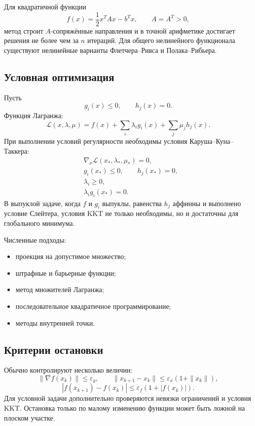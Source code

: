 Для квадратичной функции
\[
    f(x)=\frac12x^TAx-b^Tx,
    \qquad A=A^T>0,
\]
метод строит $A$-сопряжённые направления и в точной арифметике достигает решения
не более чем за $n$ итераций. Для общего нелинейного функционала существуют
нелинейные варианты Флетчера--Ривса и Полака--Рибьера.

\subsection{Условная оптимизация}

Пусть
\[
    g_i(x)\leq0,
    \qquad
    h_j(x)=0.
\]
Функция Лагранжа:
\[
    \mathcal L(x,\lambda,\mu)
    =f(x)+\sum_i\lambda_i g_i(x)+\sum_j\mu_j h_j(x).
\]
При выполнении условий регулярности необходимы условия Каруша--Куна--Таккера:
\[
\begin{aligned}
&\nabla_x\mathcal L(x_*,\lambda_*,\mu_*)=0,\\
&g_i(x_*)\leq0,\qquad h_j(x_*)=0,\\
&\lambda_i\geq0,\\
&\lambda_i g_i(x_*)=0.
\end{aligned}
\]
В выпуклой задаче, когда $f$ и $g_i$ выпуклы, равенства $h_j$ аффинны и
выполнено условие Слейтера, условия KKT не только необходимы, но и достаточны
для глобального минимума.

Численные подходы:
\begin{itemize}
    \item проекция на допустимое множество;
    \item штрафные и барьерные функции;
    \item метод множителей Лагранжа;
    \item последовательное квадратичное программирование;
    \item методы внутренней точки.
\end{itemize}

\subsection{Критерии остановки}

Обычно контролируют несколько величин:
\[
    \|\nabla f(x_k)\|\leq\varepsilon_g,
    \qquad
    \|x_{k+1}-x_k\|\leq\varepsilon_x(1+\|x_k\|),
\]
\[
    |f(x_{k+1})-f(x_k)|\leq\varepsilon_f(1+|f(x_k)|).
\]
Для условной задачи дополнительно проверяются невязки ограничений и условия KKT.
Остановка только по малому изменению функции может быть ложной на плоском участке.

